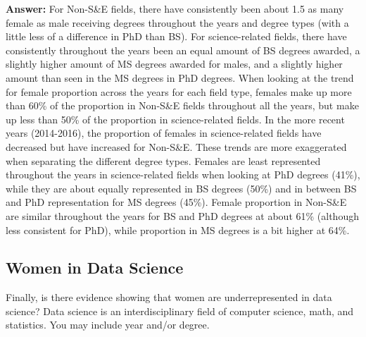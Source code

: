\documentclass[
]{article}
\begin{document}
\textbf{Answer:} For Non-S\&E fields, there have consistently been about
1.5 as many female as male receiving degrees throughout the years and
degree types (with a little less of a difference in PhD than BS). For
science-related fields, there have consistently throughout the years
been an equal amount of BS degrees awarded, a slightly higher amount of
MS degrees awarded for males, and a slightly higher amount than seen in
the MS degrees in PhD degrees. When looking at the trend for female
proportion across the years for each field type, females make up more
than 60\% of the proportion in Non-S\&E fields throughout all the years,
but make up less than 50\% of the proportion in science-related fields.
In the more recent years (2014-2016), the proportion of females in
science-related fields have decreased but have increased for Non-S\&E.
These trends are more exaggerated when separating the different degree
types. Females are least represented throughout the years in
science-related fields when looking at PhD degrees (41\%), while they
are about equally represented in BS degrees (50\%) and in between BS and
PhD representation for MS degrees (45\%). Female proportion in Non-S\&E
are similar throughout the years for BS and PhD degrees at about 61\%
(although less consistent for PhD), while proportion in MS degrees is a
bit higher at 64\%.

\hypertarget{women-in-data-science}{%
\subsection{Women in Data Science}\label{women-in-data-science}}

Finally, is there evidence showing that women are underrepresented in
data science? Data science is an interdisciplinary field of computer
science, math, and statistics. You may include year and/or degree.
\end{document}
